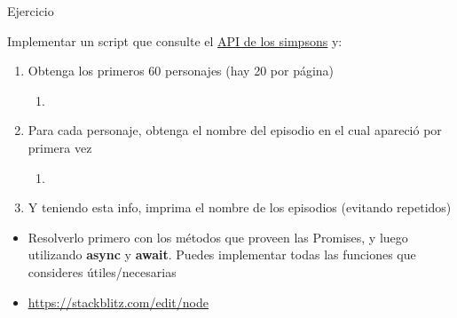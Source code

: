 \documentclass[aspectratio=43,10pt,t]{beamer}
\begin{document}
\begin{frame}{Ejercicio}\relax
\begingroup
{}
{\fontsize{10.6}{13.1}\selectfont Implementar un script que consulte el \href{https://thesimpsonsapi.com/\#docs}{\uline{API de los simpsons}} y:\par}
\begin{enumerate}
  \item Obtenga los primeros 60 personajes (hay 20 por página)
  \begin{enumerate}
    \item \href{https://thesimpsonsapi.com/api/characters}{\uline{}}\uline{}
  \end{enumerate}
  \item Para cada personaje, obtenga el nombre del episodio en el cual apareció por primera vez
  \begin{enumerate}
    \item \href{https://thesimpsonsapi.com/api/characters/5}{\uline{}}\uline{}
  \end{enumerate}
  \item Y teniendo esta info, imprima el nombre de los episodios (evitando repetidos)
\end{enumerate}
{\fontsize{10.6}{13.1}\selectfont\mbox{}\par}
\begin{itemize}
  \item[-] Resolverlo primero con los métodos que proveen las Promises, y luego utilizando \textbf{async} y \textbf{await}. Puedes implementar todas las funciones que consideres útiles/necesarias
  \item[-] \href{https://stackblitz.com/edit/node}{\uline{https:/\allowbreak{}/\allowbreak{}stackblitz.com/\allowbreak{}edit/\allowbreak{}node}}
\end{itemize}
\endgroup
\end{frame}
\end{document}
